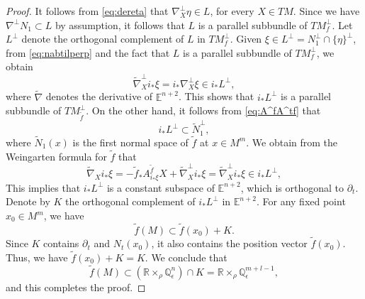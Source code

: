 \documentclass[10pt,a4paper]{amsart}
\newcommand{\E}{\mathbb{E}}
\newcommand{\Q}{\mathbb{Q}}
\newcommand{\R}{\mathbb{R}}
\newcommand{\WP}{\R\times_{\rho}\Q^n_{\epsilon}}
\newcommand{\co}{\colon}
\newcommand{\dt}{\partial_t}
\newcommand{\np}{\nabla^\perp}
\begin{document}
\begin{proof}
It follows from \eqref{eq:dereta} that $\np_X\eta\in L$, for every $X\in TM$. Since we have $\np N_1\subset L$ by assumption, it follows that $L$ is a parallel subbundle of $TM^\perp_f$.
Let $L^\perp$ denote the orthogonal complement of $L$ in $TM^\perp_f$. Given $\xi\in L^\perp=N_1^\perp\cap\{\eta\}^\perp$, from \eqref{eq:nabtilperp} and the fact that $L$ is a parallel subbundle of $TM^\perp_f$, we obtain
\[
\widetilde{\nabla}_X^\perp i_{\ast}\xi = 
i_{\ast}\nabla^{\perp}_{X} \xi \in i_{\ast}L^{\perp},
\]
where $\widetilde{\nabla}$ denotes the derivative of $\E^{n+2}$. This shows that $i_{\ast}L^{\perp}$ is a parallel subbundle of $TM^\perp_{\tilde f}$. On the other hand, it follows from \eqref{eq:A^fA^tf} that
\[
i_{\ast}L^{\perp}\subset\widetilde{N}_{1}^{\perp},
\]
where $\widetilde{N}_1(x)$ is the first normal space of $\tilde{f}$ at $x\in M^m$. We obtain from the Weingarten formula for $\tilde{f}$ that
\[
\widetilde{\nabla}_{X}i_{\ast}\xi = -\tilde{f}_{\ast}A_{ i_{\ast}\xi}^{\tilde{f}}X + \widetilde{\nabla}_{X}^{\perp}  i_{\ast}\xi=\widetilde{\nabla}_{X}^{\perp}  i_{\ast}\xi \in i_{\ast}L^{\perp},
\]
This implies that $i_{\ast}L^{\perp}$ is a constant subspace of $\E^{n+2}$, which is orthogonal to $\dt$. 
Denote by $K$ the orthogonal complement of $i_{\ast}L^{\perp}$ in $\E^{n+2}$. For any fixed point $x_0\in M^m$, we have
\[
\tilde f(M)\subset\tilde{f}(x_0)+K.
\]
Since $K$ contains $\dt$ and $N_t(x_0)$, it also contains the position vector $\tilde{f}(x_0)$. Thus, we have $\tilde{f}(x_0)+K=K$. We conclude that
\[
\tilde{f}(M)\subset(\R\times_{\rho}\Q^{n}_{\epsilon})\cap K
= \R\times_{\rho}\Q^{m+l-1}_{\epsilon},
\]
and this completes the proof.
\end{proof}
\end{document}
